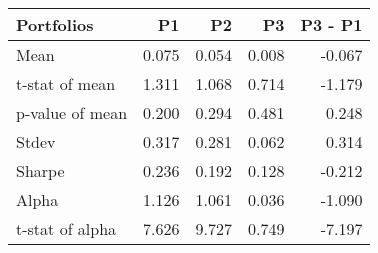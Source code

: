\begin{tabular}{lrrrr}
\toprule
Portfolios & P1 & P2 & P3 & P3 - P1 \\
\midrule
Mean & 0.075 & 0.054 & 0.008 & -0.067 \\
t-stat of mean & 1.311 & 1.068 & 0.714 & -1.179 \\
p-value of mean & 0.200 & 0.294 & 0.481 & 0.248 \\
Stdev & 0.317 & 0.281 & 0.062 & 0.314 \\
Sharpe & 0.236 & 0.192 & 0.128 & -0.212 \\
Alpha & 1.126 & 1.061 & 0.036 & -1.090 \\
t-stat of alpha & 7.626 & 9.727 & 0.749 & -7.197 \\
\bottomrule
\end{tabular}
